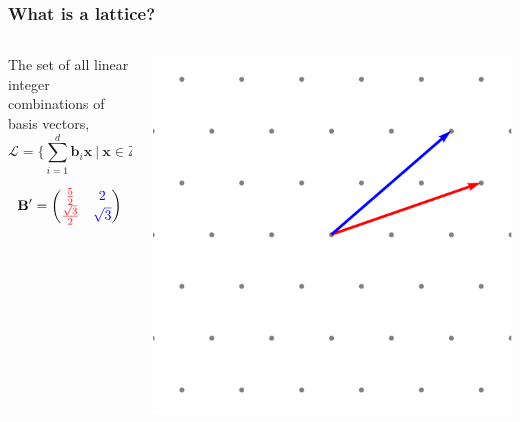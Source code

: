 \documentclass[
aspectratio=169, %
t, %
onlytextwidth, %
10pt, %
]{beamer}
\begin{document}

\begin{frame}
    \frametitle{What is a lattice?}
    \begin{columns}[T]
        \begin{column}{0.48\linewidth}
            \begin{center}
            \begin{tcolorbox}[colback=ICLBlue!5!white,colframe=ICLBlue,title=\textbf{Definition:} Lattice]
                The set of all linear integer combinations of basis vectors,
                \[
                    \mathcal{L} = \{ \sum_{i = 1}^{d}\mathbf{b}_i\mathbf{x} \ | \ \mathbf{x} \in \mathbb{Z}^d \}
                \]
            \end{tcolorbox}

            \[
                \mathbf{B'} = \begin{pmatrix}
                    \color{red}\frac{5}{2} & \color{blue}2\\
                    \color{red}\frac{\sqrt{3}}{2} & \color{blue}\sqrt{3}
                \end{pmatrix}
            \]
            \end{center}
        \end{column}
        \begin{column}{0.48\linewidth}
            \includegraphics[width=\linewidth]{a2_bad_basis.png}
        \end{column}
    \end{columns}
\end{frame}
\end{document}
